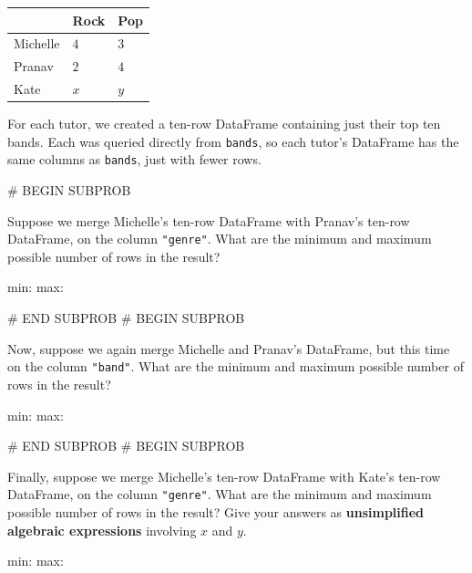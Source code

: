 \documentclass[twoside,12pt]{article}
\begin{document}
{        \begin{center}
            \begin{tabular}{lll}
                \toprule
                 & Rock & Pop \\
                \midrule
                Michelle & $4$ & $3$ \\
                Pranav & $2$ & $4$ \\
                Kate & $x$ & $y$ \\
                \bottomrule
            \end{tabular}
        \end{center}

For each tutor, we created a ten-row DataFrame containing just their top ten bands. Each was queried directly from \texttt{bands}, so each tutor's DataFrame has the same columns as \texttt{bands}, just with fewer rows.


# BEGIN SUBPROB


Suppose we merge Michelle's ten-row DataFrame with Pranav's ten-row DataFrame, on the column \texttt{"genre"}. What are the minimum and maximum possible number of rows in the result?
    
    \begin{center}
        min:  \qquad
        max: 
    \end{center}
    


# END SUBPROB
# BEGIN SUBPROB


    Now, suppose we again merge Michelle and Pranav's DataFrame, but this time on the column \texttt{"band"}. What are the minimum and maximum possible number of rows in the result?

    \begin{center}
        min:  \qquad
        max: 
    \end{center}
    


# END SUBPROB
# BEGIN SUBPROB


    Finally, suppose we merge Michelle's ten-row DataFrame with Kate's ten-row DataFrame, on the column \texttt{"genre"}. What are the minimum and maximum possible number of rows in the result? Give your answers as \textbf{unsimplified algebraic expressions} involving $x$ and $y$.

    \begin{center}
        min:  \qquad
        max: 
    \end{center}
    


}
\end{document}
